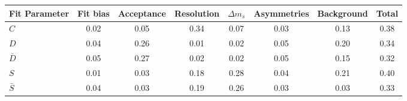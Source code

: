 \begin{tabular}{l  c  c  c  c  c  c  | c }
\hline
\hline
Fit Parameter & Fit bias & Acceptance & Resolution & $\Delta m_{s}$ & Asymmetries & Background &  Total  \\ 
\hline
$C$ & 0.02 & 0.05 & 0.34 & 0.07 & 0.03 & 0.13 & 0.38 \\ 
$D$ & 0.04 & 0.26 & 0.01 & 0.02 & 0.05 & 0.20 & 0.34 \\ 
$\bar{D}$ & 0.05 & 0.27 & 0.02 & 0.02 & 0.05 & 0.15 & 0.32 \\ 
$S$ & 0.01 & 0.03 & 0.18 & 0.28 & 0.04 & 0.21 & 0.40 \\ 
$\bar{S}$ & 0.04 & 0.03 & 0.19 & 0.26 & 0.03 & 0.03 & 0.33 \\ 
\hline
\hline
\end{tabular}
